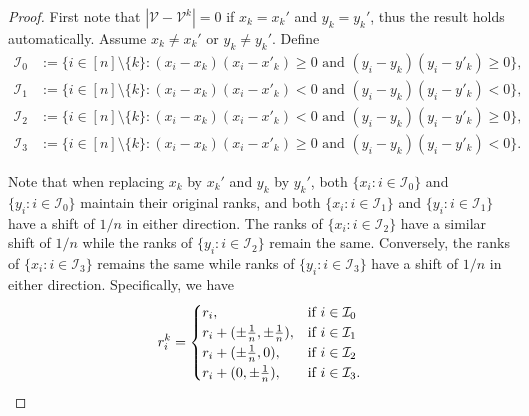 \documentclass[11pt]{article}
\begin{document}
\begin{proof}
First note that $|\mathcal{V} - \mathcal{V}^k| = 0$ if $x_k = x_k'$ and $y_k = y_k'$, thus the result holds automatically. Assume $x_k\neq x_k'$ or $y_k \neq y_k'$. Define
\begin{align*}
    \mathcal{I}_0 &:= \{i \in [n]\setminus\{k\}: \text{$(x_i - x_k)(x_i - x'_k) \geq 0$ and $(y_i - y_k)(y_i - y'_k)\geq 0$}\}, \\  
    \mathcal{I}_1 &:= \{i \in [n]\setminus\{k\}: \text{$(x_i - x_k)(x_i - x'_k)  < 0$ and $(y_i - y_k)(y_i - y'_k) < 0$}\},\\  
    \mathcal{I}_2 &:= \{i \in [n]\setminus\{k\}: \text{$(x_i - x_k)(x_i - x'_k)  < 0$ and $(y_i - y_k)(y_i - y'_k) \geq 0$}\},\\
    \mathcal{I}_3 &:= \{i \in [n]\setminus\{k\}: \text{$(x_i - x_k)(x_i - x'_k)  \geq 0$ and $(y_i - y_k)(y_i - y'_k) < 0$}\}.
\end{align*}


Note that when replacing $x_k$ by $x_k'$ and $y_k$ by $y_k'$, both $\{x_i: i \in \mathcal{I}_0\}$ and $\{y_i: i \in \mathcal{I}_0\}$ maintain their original ranks, and both $\{x_i: i \in \mathcal{I}_1\}$ and $\{y_i: i \in \mathcal{I}_1\}$ have a shift of $1/n$ in either direction. The ranks of $\{x_i: i \in \mathcal{I}_2\}$ have a similar shift of $1/n$ while the ranks of $\{y_i: i \in \mathcal{I}_2\}$ remain the same. Conversely, the ranks of $\{x_i: i \in \mathcal{I}_3\}$ remains the same while ranks of $\{y_i: i \in \mathcal{I}_3\}$ have a shift of $1/n$ in either direction. Specifically, we have 
\begin{align}
    r_i^{k} = \begin{cases}
        r_i,  &\text{if $i \in \mathcal{I}_0$} \\ 
        r_i + (\pm \frac{1}{n}, \pm \frac{1}{n}),  &\text{if $i \in \mathcal{I}_1$} \\ 
        r_i + (\pm \frac{1}{n}, 0),  &\text{if $ i \in \mathcal{I}_2$} \\
        r_i + (0, \pm \frac{1}{n}),  &\text{if $ i \in \mathcal{I}_3$}.
    \end{cases} \label{eq:rankchange}
\end{align}


\end{proof}
\end{document}
